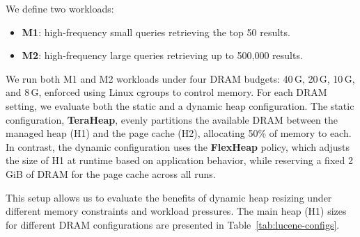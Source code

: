 We define two workloads:
\begin{itemize}[leftmargin=1.5em]
  \item \textbf{M1}: high-frequency small queries retrieving the top 50 results.
  \item \textbf{M2}: high-frequency large queries retrieving up to 500{,}000 results.
\end{itemize}

We run both M1 and M2 workloads under four DRAM budgets: 40\,G, 20\,G, 10\,G, and 8\,G,
enforced using Linux cgroups to control memory. 
For each DRAM setting, we evaluate both the static and a dynamic heap configuration. 
The static configuration, \textbf{TeraHeap}, evenly partitions the available DRAM between the 
managed heap (H1) and the page cache (H2), allocating 50\% of memory to each. In contrast, 
the dynamic configuration uses the \textbf{FlexHeap} policy, which adjusts the size of H1 
at runtime based on application behavior, while reserving a fixed 2\,GiB of DRAM for the page cache across all runs.

This setup allows us to evaluate the benefits of dynamic heap resizing under different memory constraints and workload pressures. 
The main heap (H1) sizes for different DRAM configurations are presented in Table~\ref{tab:lucene-configs}.



